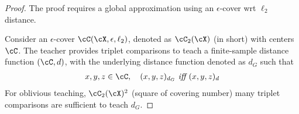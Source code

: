 \begin{proof}
    The proof requires a global approximation using an $\epsilon$-cover wrt $\ell_2$ distance.
    
   Consider an $\epsilon$-cover $\cC(\cX,\epsilon,\ell_2)$, denoted as $\cC_2(\cX)$ (in short) with centers $\cC$. The teacher provides triplet comparisons to teach a finite-sample distance function $(\cC, d)$, with the underlying distance function denoted as $d_G$ such that
        \begin{align*}
            x,y,z \in \cC,\quad (x,y,z)_{d_G} \textit{ iff } (x,y,z)_{d}
        \end{align*}
        For oblivious teaching,  $\cC_2(\cX)^2$ (square of covering number) many triplet comparisons are sufficient to teach $d_G$.


\end{proof}
